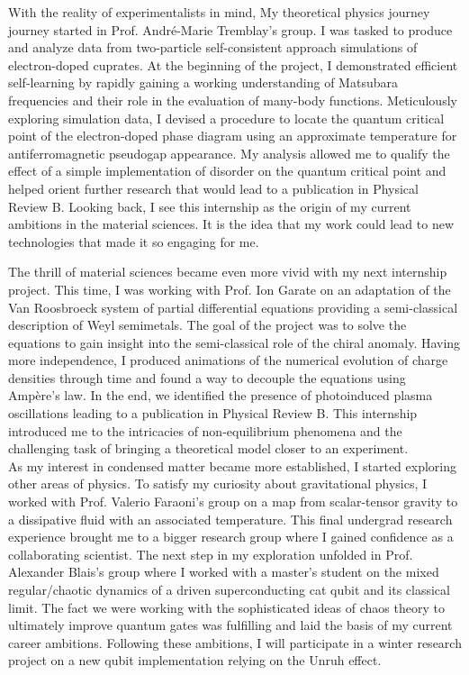 \documentclass[12pt]{article}
\begin{document}
With the reality of experimentalists in mind, My theoretical physics journey journey started in Prof. André-Marie Tremblay's group. I was tasked to produce and analyze data from two-particle self-consistent approach simulations of electron-doped cuprates. At the beginning of the project, I demonstrated efficient self-learning by rapidly gaining a working understanding of Matsubara frequencies and their role in the evaluation of many-body functions. Meticulously exploring simulation data, I devised a procedure to locate the quantum critical point of the electron-doped phase diagram using an approximate temperature for antiferromagnetic pseudogap appearance. My analysis allowed me to qualify the effect of a simple implementation of disorder on the quantum critical point and helped orient further research that would lead to a publication in Physical Review B. Looking back, I see this internship as the origin of my current ambitions in the material sciences. It is the idea that my work could lead to new technologies that made it so engaging for me.\\ 

\newpage

The thrill of material sciences became even more vivid with my next internship project. This time, I was working with Prof. Ion Garate on an adaptation of the Van Roosbroeck system of partial differential equations providing a semi-classical description of Weyl semimetals. The goal of the project was to solve the equations to gain insight into the semi-classical role of the chiral anomaly. Having more independence, I produced animations of the numerical evolution of charge densities through time and found a way to decouple the equations using Ampère's law. In the end, we identified the presence of photoinduced plasma oscillations leading to a publication in Physical Review B. This internship introduced me to the intricacies of non-equilibrium phenomena and the challenging task of bringing a theoretical model closer to an experiment.\\ 

As my interest in condensed matter became more established, I started exploring other areas of physics. To satisfy my curiosity about gravitational physics, I worked with Prof. Valerio Faraoni's group on a map from scalar-tensor gravity to a dissipative fluid with an associated temperature. This final undergrad research experience brought me to a bigger research group where I gained confidence as a collaborating scientist. The next step in my exploration unfolded in Prof. Alexander Blais's group where I worked with a master's student on the mixed regular/chaotic dynamics of a driven superconducting cat qubit and its classical limit. The fact we were working with the sophisticated ideas of chaos theory to ultimately improve quantum gates was fulfilling and laid the basis of my current career ambitions. Following these ambitions, I will participate in a winter research project on a new qubit implementation relying on the Unruh effect.\\ 
\end{document}
